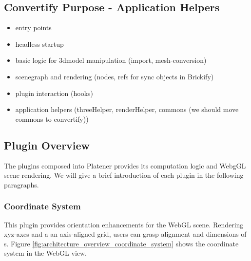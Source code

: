 \documentclass[../ClassicThesis.tex]{subfiles}
\begin{document}
\subsection{Convertify Purpose - Application Helpers}

\begin{itemize}
\item entry points
\item headless startup
\item basic logic for 3dmodel manipulation (import, mesh-conversion)
\item scenegraph and rendering (nodes, refs for sync objects in Brickify)
\item plugin interaction (hooks)
\item application helpers (threeHelper, renderHelper, commons (we should move commons to convertify))
\end{itemize}

\subsection{Plugin Overview}


The plugins composed into Platener provides its computation logic and WebgGL
scene rendering. We will give a brief introduction of each plugin in the
following paragraphs.

\subsubsection{Coordinate System}

This plugin provides orientation enhancements for the WebGL scene. Rendering
xyz-axes and a an axis-aligned grid, users can grasp alignment and dimensions of
{\threedmodel}s. Figure \ref{fig:architecture_overview_coordinate_system} shows
the coordinate system in the WebGL view.
\end{document}
